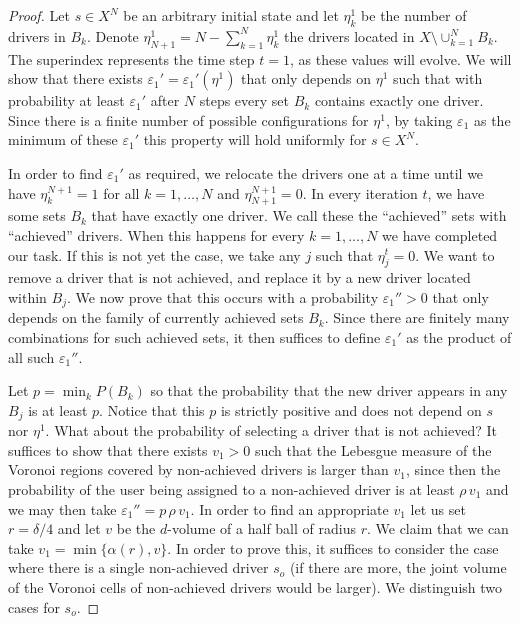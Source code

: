 \documentclass[12pt,english]{article}
\begin{document}
{\begin{proof}
Let $s\in X^N$ be an arbitrary initial state and let $\eta_k^1$ be the number of drivers in $B_k$. Denote $\eta^1_{N+1}=N-\sum_{k=1}^N\eta_k^1$ the drivers located in $X\setminus\cup_{k=1}^NB_k$. The superindex represents the time step $t=1$, as these values will evolve. We will show that there exists $\varepsilon_1'=\varepsilon_1'(\eta^1)$ that only depends on $\eta^1$ such that with probability at least
$\varepsilon_1'$ after $N$ steps
every set $B_k$ contains exactly one driver.
Since there is a finite number of possible configurations for $\eta^1$, by taking $\varepsilon_1$ as the minimum of these $\varepsilon_1'$ this property will hold uniformly for $s\in X^N$.  

In order to find  $\varepsilon_1'$ as required, we relocate the drivers one at a time  until we have $\eta^{N+1}_k=1$ for all $k=1,\ldots,N$ and $\eta^{N+1}_{N+1}=0$. In every iteration $t$, we have some sets $B_k$ that have exactly one driver. We call these the ``achieved'' sets with ``achieved'' drivers. When this happens for every $k=1,...,N$ we have 
completed our task. If this is not yet the case, we take any $j$ such that $\eta^t_j=0$. We want to remove a driver that is not  achieved, and replace it by a new driver located within $B_j$. We now prove that this occurs with a probability $\varepsilon_1''>0$ that 
only depends on the family of currently achieved sets $B_k$. Since there are finitely many combinations for such achieved sets, it then suffices to define $\varepsilon_1'$ as the product of all such $\varepsilon_1''$. 

Let $p=\min_{k}P(B_k)$ so that the probability that the new driver appears in any $B_j$ is at least $p$. Notice that this $p$ is strictly positive and does not depend on $s$ nor $\eta^1$. What about the probability of selecting a driver that is not achieved? It suffices to show that there exists $v_1>0$ such that the Lebesgue measure of the Voronoi regions covered by non-achieved drivers  is larger than $v_1$, since then the probability of the user being assigned to a non-achieved driver is at least $\rho\,v_1$ and we may then take $\varepsilon_1''=p\,\rho\,v_1$. In order to find an appropriate $v_1$ let us set $r=\delta/4$ and let $v$ be the $d$-volume of a half ball of radius $r$. We claim that we can take $v_1=\min\{\alpha(r),v\}$. In order to prove this, it suffices to 
 consider the case where there is a single non-achieved driver $s_o$ (if there are more, the joint volume of the Voronoi cells of non-achieved drivers would be larger). We distinguish two cases for $s_o$.
 \vspace{-2ex}
 

\end{proof}}
\end{document}
